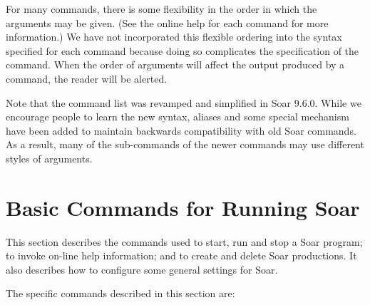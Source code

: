 For many commands, there is some flexibility in the order in which the arguments may be given. (See the online help for each command for more information.)  We have not incorporated this flexible ordering into the syntax specified for each command because doing so complicates the specification of the command.  When the order of arguments will affect the output produced by a command, the reader will be alerted.

Note that the command list was revamped and simplified in Soar 9.6.0.  While we encourage people to learn the new syntax, aliases and some special mechanism have been added to maintain backwards compatibility with old Soar commands.  As a result, many of the sub-commands of the newer commands may use different styles of arguments.

\section{Basic Commands for Running Soar}
\label{INTERFACE-basic}

This section describes the commands used to start, run and stop a Soar program; to invoke on-line help information; and to create and delete Soar productions. It also describes how to configure some general settings for Soar.

The specific commands described in this section are:

